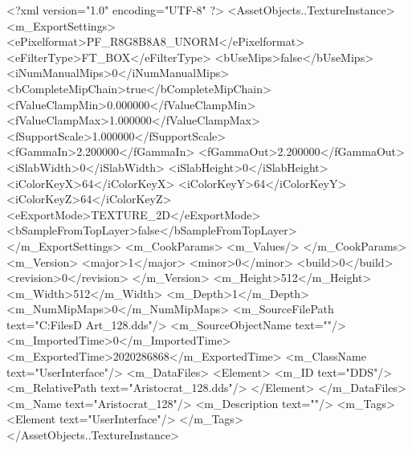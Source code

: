 <?xml version="1.0" encoding="UTF-8" ?>
<AssetObjects..TextureInstance>
	<m_ExportSettings>
		<ePixelformat>PF_R8G8B8A8_UNORM</ePixelformat>
		<eFilterType>FT_BOX</eFilterType>
		<bUseMips>false</bUseMips>
		<iNumManualMips>0</iNumManualMips>
		<bCompleteMipChain>true</bCompleteMipChain>
		<fValueClampMin>0.000000</fValueClampMin>
		<fValueClampMax>1.000000</fValueClampMax>
		<fSupportScale>1.000000</fSupportScale>
		<fGammaIn>2.200000</fGammaIn>
		<fGammaOut>2.200000</fGammaOut>
		<iSlabWidth>0</iSlabWidth>
		<iSlabHeight>0</iSlabHeight>
		<iColorKeyX>64</iColorKeyX>
		<iColorKeyY>64</iColorKeyY>
		<iColorKeyZ>64</iColorKeyZ>
		<eExportMode>TEXTURE_2D</eExportMode>
		<bSampleFromTopLayer>false</bSampleFromTopLayer>
	</m_ExportSettings>
	<m_CookParams>
		<m_Values/>
	</m_CookParams>
	<m_Version>
		<major>1</major>
		<minor>0</minor>
		<build>0</build>
		<revision>0</revision>
	</m_Version>
	<m_Height>512</m_Height>
	<m_Width>512</m_Width>
	<m_Depth>1</m_Depth>
	<m_NumMipMaps>0</m_NumMipMaps>
	<m_SourceFilePath text="C:\Users\Shadow\Desktop\Working Files\2D Art\Quarters\Aristocrat\Aristocrat_128.dds"/>
	<m_SourceObjectName text=""/>
	<m_ImportedTime>0</m_ImportedTime>
	<m_ExportedTime>2020286868</m_ExportedTime>
	<m_ClassName text="UserInterface"/>
	<m_DataFiles>
		<Element>
			<m_ID text="DDS"/>
			<m_RelativePath text="Aristocrat_128.dds"/>
		</Element>
	</m_DataFiles>
	<m_Name text="Aristocrat_128"/>
	<m_Description text=""/>
	<m_Tags>
		<Element text="UserInterface"/>
	</m_Tags>
</AssetObjects..TextureInstance>

